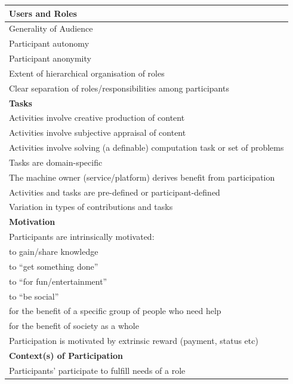 \documentclass{sig-alternate}
\begin{document}
\begin{table}[htb]
\begin{center}
\begin{tabular}{|p{8cm}|}
\hline
{\bf Users and Roles} \\
\hline
Generality of Audience \\
Participant autonomy \\
Participant anonymity \\
Extent of hierarchical organisation of roles \\
Clear separation of roles/responsibilities among participants \\
\hline
{\bf Tasks} \\
\hline
Activities involve creative production of content \\
Activities involve subjective appraisal of content \\
Activities involve solving (a definable) computation task or set of problems\\
Tasks are domain-specific \\
The machine owner (service/platform) derives benefit from participation \\
Activities and tasks are pre-defined or participant-defined \\
Variation in types of contributions and tasks \\
\hline
{\bf Motivation} \\
\hline
Participants are intrinsically motivated:\\
\hspace{1cm} to gain/share knowledge \\
\hspace{1cm} to ``get something done'' \\
\hspace{1cm} to ``for fun/entertainment''\\
\hspace{1cm} to ``be social'' \\
\hspace{1cm} for the benefit of a specific group of people who need help \\
\hspace{1cm} for the benefit of society as a whole \\
Participation is motivated by extrinsic reward (payment, status etc) \\
\hline
{\bf Context(s) of Participation} \\
\hline
Participants' participate to fulfill needs of a role  \\

\end{tabular}
\end{center}
\end{table}
\end{document}
